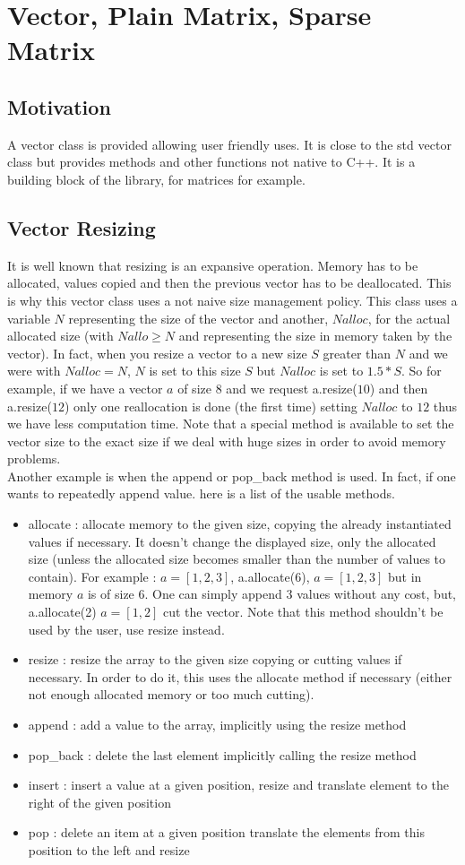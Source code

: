 \documentclass[a4paper]{report}
\begin{document}
\chapter{Vector, Plain Matrix, Sparse Matrix }
\section{Motivation}
A vector class is provided allowing user friendly uses. It is close to the std vector class but provides methods and other functions not native to C++.
It is a building block of the library, for matrices for example. 
\section{Vector Resizing}
It is well known that resizing is an expansive operation. Memory has to be allocated, values copied and then the previous vector has to be deallocated. This is why this vector class uses a not naive size management policy.
This class uses a variable $N$ representing the size of the vector and another, $Nalloc$, for the actual allocated size (with $Nallo \geq N$ and representing the size in memory taken by the vector). In fact, when you resize a vector to a new size $S$ greater than $N$ and we were with $Nalloc=N$, $N$ is set to this size $S$ but $Nalloc$ is set to $1.5*S$. So for example, if we have a vector $a$ of size $8$ and we request a.resize($10$) and then a.resize($12$) only one reallocation is done (the first time) setting $Nalloc$ to $12$ thus we have less computation time. Note that a special method is available to set the vector size to the exact size if we deal with huge sizes in order to avoid memory problems.
\\
Another example is when the append or pop\_back method is used. In fact, if one wants to repeatedly append value. here is a list of the usable methods.
\begin{itemize}
\item allocate : allocate memory to the given size, copying the already instantiated values if necessary. It doesn't change the displayed size, only the allocated size (unless the allocated size becomes smaller than the number of values to contain). For example : $a=[1,2,3]$, a.allocate(6), $a=[1,2,3]$ but in memory $a$ is of size $6$. One can simply append $3$ values without any cost, but, a.allocate(2) $a=[1,2]$ cut the vector. Note that this method shouldn't be used by the user, use resize instead.
\item resize : resize the array to the given size copying or cutting values if necessary. In order to do it, this uses the allocate method if necessary (either not enough allocated memory or too much cutting).
\item append : add a value to the array, implicitly using the resize method
\item pop\_back : delete the last element implicitly calling the resize method
\item insert : insert a value at a given position, resize and translate element to the right of the given position
\item pop : delete an item at a given position translate the elements from this position to the left and resize
\end{itemize}
\end{document}
